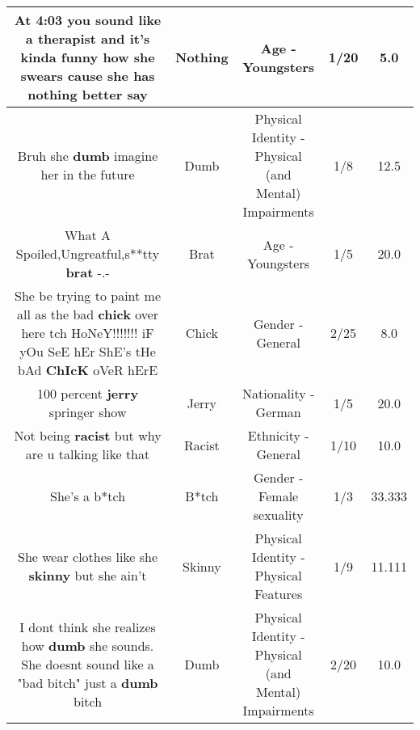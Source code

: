 \documentclass[11pt]{article}
\newlength\mylength
\begin{document}
\begin{center}
\begin{longtable}{|C{.65\mylength}|C{.30\mylength}|C{.12\mylength}|C{.12\mylength}|C{.12\mylength}|}
  \small At 4:03 you sound like a therapist and it's kinda funny how she swears cause she has \textbf{nothing} better say\normalsize   & Nothing & Age - Youngsters & 1/20 & 5.0 \\  \hline
  \small Bruh she \textbf{dumb} imagine her in the future\normalsize   & Dumb & Physical Identity - Physical (and Mental) Impairments & 1/8 & 12.5 \\  \hline
  \small What A Spoiled,Ungreatful,s**tty \textbf{brat} -.-\normalsize   & Brat & Age - Youngsters & 1/5 & 20.0 \\  \hline
  \small She be trying to paint me all as the bad \textbf{chick} over here tch HoNeY!!!!!!! iF yOu SeE hEr ShE's tHe bAd \textbf{ChIcK} oVeR hErE\normalsize   & Chick & Gender - General & 2/25 & 8.0 \\  \hline
  \small 100 percent \textbf{jerry} springer show\normalsize   & Jerry & Nationality - German & 1/5 & 20.0 \\  \hline
  \small Not being \textbf{racist} but why are u talking like that\normalsize   & Racist & Ethnicity - General & 1/10 & 10.0 \\  \hline
  \small She's a b*tch\normalsize   & B*tch & Gender - Female sexuality & 1/3 & 33.333 \\  \hline
  \small She wear clothes like she \textbf{skinny} but she ain't\normalsize   & Skinny & Physical Identity - Physical Features & 1/9 & 11.111 \\  \hline
  \small I dont think she realizes how \textbf{dumb} she sounds. She doesnt sound like a "bad bitch" just a \textbf{dumb} bitch\normalsize   & Dumb & Physical Identity - Physical (and Mental) Impairments & 2/20 & 10.0 \\  \hline

\end{longtable}
\end{center}
\end{document}
